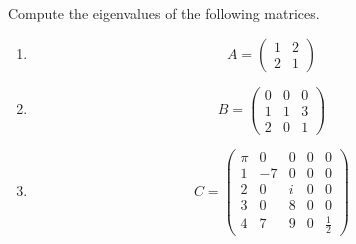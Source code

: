 Compute the eigenvalues of the following matrices.

\begin{enumerate}
\item 
	$$
	A = \begin{pmatrix}
	1&2\\
	2&1
	\end{pmatrix}
	$$
%
\item
$$
B = \begin{pmatrix}
	0&0&0\\
	1&1&3\\
	2&0&1
	\end{pmatrix}
$$
%
\item 
$$C=
\begin{pmatrix}
\pi& 0& 0& 0 &0\\
1 & -7&  0& 0 &0\\
2 & 0& i  & 0 &0\\
3 & 0& 8  & 0 & 0\\
4 & 7& 9& 0& \frac{1}{2}
\end{pmatrix}
$$
\end{enumerate}
 